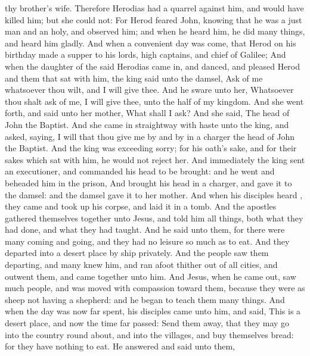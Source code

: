{thy
brother’s
wife.
Therefore
Herodias had a
quarrel against
him,
and
would have
killed
him;
but she
could
not:
For
Herod
feared
John,
knowing that
he was a
just
man
and an
holy,
and
observed
him;
and when he
heard
him, he
did many
things,
and
heard
him
gladly.
And
when a
convenient
day was
come, that
Herod on
his
birthday
made a
supper to
his
lords, high
captains,
and
chief
{} of
Galilee;
And when the
daughter of the
said
Herodias came
in,
and
danced,
and
pleased
Herod
and
them that sat with
him, the
king
said unto the
damsel,
Ask of
me
whatsoever thou
wilt,
and I will
give
{}
thee.
And he
sware unto
her,
Whatsoever thou shalt
ask of
me, I will
give
{}
thee,
unto the
half of
my
kingdom.
And she went
forth, and
said unto
her
mother,
What shall I
ask?
And she
said, The
head of
John the
Baptist.
And she came
in
straightway
with
haste
unto the
king, and
asked,
saying, I
will
that thou
give
me by and
by
in a
charger the
head of
John the
Baptist.
And the
king
was exceeding
sorry;
{}
for his
oath’s sake,
and for their sakes
which sat with
him, he
would
not
reject
her.
And
immediately the
king
sent an
executioner, and
commanded
his
head to be
brought:
and he
went and
beheaded
him
in the
prison,
And
brought
his
head
in a
charger,
and
gave
it to the
damsel:
and the
damsel
gave
it to
her
mother.
And when
his
disciples
heard
{}, they
came
and took
up
his
corpse,
and
laid
it
in a
tomb.
And the
apostles gathered themselves
together
unto
Jesus,
and
told
him all
things,
both
what they had
done,
and
what they had
taught.
And he
said unto
them,
{}
for there
were
many
coming
and
going,
and they
had
no
leisure so much as to
eat.
And they
departed
into a
desert
place by
ship
privately.
And the
people
saw
them
departing,
and
many
knew
him,
and
ran
afoot
thither
out of
all
cities,
and
outwent
them,
and came
together
unto
him.
And
Jesus, when he came
out,
saw
much
people,
and was moved with
compassion
toward
them,
because they
were
as
sheep
not
having a
shepherd:
and he
began to
teach
them many
things.
And when the
day
was
now far
spent,
his
disciples
came unto
him, and
said, This
is a
desert
place,
and
now the
time
{} far
passed:
Send
them
away,
that they may
go
into the
country round
about,
and into the
villages, and
buy
themselves
bread:
for they
have
nothing to
eat.
He
answered and
said unto
them,
{}
}
